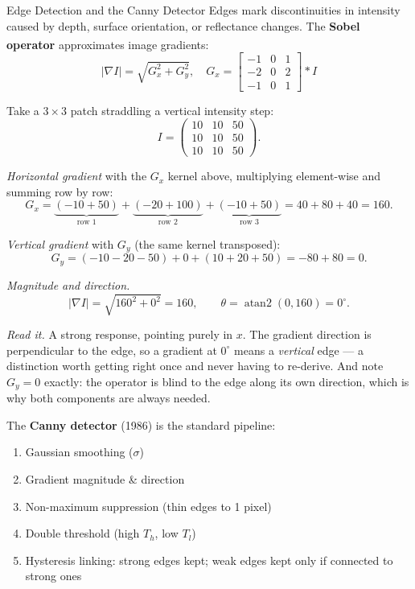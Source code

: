 \begin{v3topic}{Edge Detection and the Canny Detector}
    Edges mark discontinuities in intensity caused by depth, surface orientation, or reflectance changes.
    The \textbf{Sobel operator} approximates image gradients\textsuperscript{\cite[][pp.~693--706]{gonzalezWoods2018}}:
    \begin{equation}
        |\nabla I| = \sqrt{G_x^2 + G_y^2}, \quad
        G_x = \begin{bmatrix}-1&0&1\\-2&0&2\\-1&0&1\end{bmatrix} * I
        \label{eq:cv-sobel}
    \end{equation}

\begin{workedexample}
Take a $3\times3$ patch straddling a vertical intensity step:
\[
  I = \begin{pmatrix} 10 & 10 & 50\\ 10 & 10 & 50\\ 10 & 10 & 50 \end{pmatrix}.
\]

\emph{Horizontal gradient} with the $G_x$ kernel above, multiplying
element-wise and summing row by row:
\[
  G_x = \underbrace{(-10+50)}_{\text{row 1}} + \underbrace{(-20+100)}_{\text{row 2}}
      + \underbrace{(-10+50)}_{\text{row 3}} = 40+80+40 = 160 .
\]

\emph{Vertical gradient} with $G_y$ (the same kernel transposed):
\[
  G_y = (-10-20-50) + 0 + (10+20+50) = -80 + 80 = 0 .
\]

\emph{Magnitude and direction.}
\[
  |\nabla I| = \sqrt{160^2 + 0^2} = 160,
  \qquad
  \theta = \operatorname{atan2}(0,160) = 0^\circ .
\]

\emph{Read it.} A strong response, pointing purely in $x$. The gradient
direction is perpendicular to the edge, so a gradient at $0^\circ$ means a
\emph{vertical} edge --- a distinction worth getting right once and never
having to re-derive. And note $G_y = 0$ exactly: the operator is blind to the
edge along its own direction, which is why both components are always needed.
\end{workedexample}
    The \textbf{Canny detector} (1986) is the standard pipeline:
    \begin{enumerate}
        \item Gaussian smoothing ($\sigma$)
        \item Gradient magnitude \& direction
        \item Non-maximum suppression (thin edges to 1 pixel)
        \item Double threshold (high $T_h$, low $T_l$)
        \item Hysteresis linking: strong edges kept; weak edges kept only if connected to strong ones
    \end{enumerate}

\end{v3topic}
